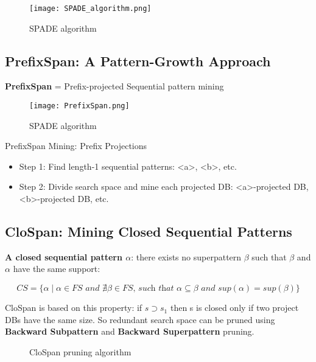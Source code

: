 \begin{figure}[H]
    \centering
    \texttt{[image: SPADE\_algorithm.png]}
    \caption{SPADE algorithm}
\end{figure}

\subsection{PrefixSpan: A Pattern-Growth Approach}
\textbf{PrefixSpan} = Prefix-projected Sequential pattern mining

\begin{figure}[H]
    \centering
    \texttt{[image: PrefixSpan.png]}
    \caption{SPADE algorithm}
\end{figure}

PrefixSpan Mining: Prefix Projections
\begin{itemize}
\item Step 1: Find length-1 sequential patterns: <a>, <b>, etc.
\item Step 2: Divide search space and mine each projected DB: <a>-projected DB, <b>-projected DB, etc.
\end{itemize}

\subsection{CloSpan: Mining Closed Sequential Patterns}
\begin{definition}
\textbf{A closed sequential pattern $\alpha$}: there exists no superpattern $\beta$ such that $\beta$ and $\alpha$ have the same support:
\end{definition}
\begin{equation*}
CS = \{\alpha \mid \alpha \in FS \textit{ and } \nexists \beta \in FS \textit{, such that } \alpha \subseteq \beta \textit{ and } sup(\alpha) = sup(\beta)\}
\end{equation*}

CloSpan is based on this property: if $s \supset s_1$ then s is closed only if two project DBs have the same size. So redundant search space can be pruned using \textbf{Backward Subpattern} and \textbf{Backward Superpattern} pruning.

\begin{figure}[h]
\centering
{}
\quad
{}

\caption{CloSpan pruning algorithm}
\label{fig:clospan}
\end{figure}

